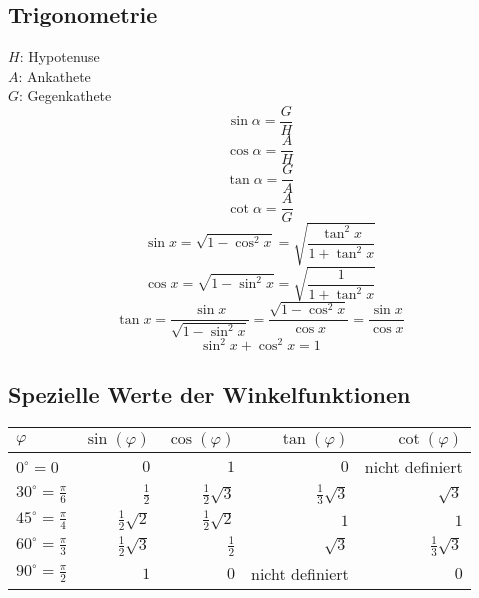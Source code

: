 \subsection{Trigonometrie}
$H$: Hypotenuse\\
$A$: Ankathete\\
$G$: Gegenkathete
\[ \boxed{\sin\alpha=\frac{G}{H}} \]
\[ \boxed{\cos\alpha=\frac{A}{H}} \]
\[ \boxed{\tan\alpha=\frac{G}{A}} \]
\[ \boxed{\cot\alpha=\frac{A}{G}} \]
\[ \boxed{\sin x = \sqrt{1-\cos^2x} = \sqrt{\frac{\tan^2x}{1+\tan^2x}}} \]
\[ \boxed{\cos x = \sqrt{1-\sin^2x} = \sqrt{\frac{1}{1+\tan^2x}}} \]
\[ \boxed{\tan x = \frac{\sin x}{\sqrt{1-\sin^2x}} = \frac{\sqrt{1-\cos^2x}}{\cos x} = \frac{\sin x}{\cos x}} \]
\[ \boxed{\sin^2 x + \cos^2 x = 1} \]

\subsection{Spezielle Werte der Winkelfunktionen}

\begin{tabular}{|l||r|r|r|r|}
\hline $\varphi$                    &          $\sin(\varphi)$&          $\cos(\varphi)$&          $\tan(\varphi)$&          $\cot(\varphi)$\\
\hline $0^\circ=0$                  &                      $0$&                      $1$&                      $0$&          nicht definiert\\
\hline $30^\circ=\frac{\pi}{6}$     &            $\frac{1}{2}$&    $\frac{1}{2}\sqrt{3}$&    $\frac{1}{3}\sqrt{3}$&               $\sqrt{3}$\\
\hline $45^\circ=\frac{\pi}{4}$     &    $\frac{1}{2}\sqrt{2}$&    $\frac{1}{2}\sqrt{2}$&                      $1$&                      $1$\\
\hline $60^\circ=\frac{\pi}{3}$     &    $\frac{1}{2}\sqrt{3}$&            $\frac{1}{2}$&               $\sqrt{3}$&    $\frac{1}{3}\sqrt{3}$\\
\hline $90^\circ=\frac{\pi}{2}$     &                      $1$&                      $0$&          nicht definiert&                      $0$\\

\hline\end{tabular}


